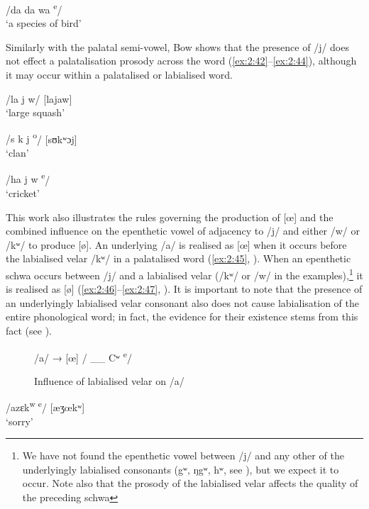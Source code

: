 \ea \label{ex:2:41}
\textup{/da da wa  \textsuperscript{e}}\textup{/  \ExampleSpace   [dɛdɛwɛ]}\\
\glt  ‘a species of bird’
\z

Similarly with the palatal semi-vowel, Bow shows that the presence of /j/ does not effect a palatalisation prosody across the word (\ref{ex:2:42}--\ref{ex:2:44}), although it may occur within a palatalised or labialised word.

\ea \label{ex:2:42}
\textup{/la j w/   \ExampleSpace \hspace{5pt} [lajaw]}\\
\glt  ‘large squash’
\z

\ea \label{ex:2:43}
\textup{/s k j \textsuperscript{o}}\textup{/    \ExampleSpace \hspace{5pt}   [sʊkʷɔj] }\\
\glt  ‘clan’    
\z

\ea \label{ex:2:44}
\textup{/ha j w\textsuperscript{ e}}\textup{/     \ExampleSpace [hɛjɛw]}\\
\glt  ‘cricket’  
\z

This work also illustrates the rules governing the production of [œ] and the combined influence on the epenthetic vowel of adjacency to /j/ and either /w/ or /kʷ/  to produce [ø]. An underlying /a/ is realised as [œ] when it occurs before the labialised velar /kʷ/ in a palatalised word (\ref{ex:2:45}, ). When an epenthetic schwa occurs between /j/ and a labialised velar (/kʷ/ or /w/ in the examples),\footnote{We have not found the epenthetic vowel between /j/ and any other of the underlyingly labialised consonants (gʷ, ŋgʷ, hʷ, see ), but we expect it to occur.  Note also that the prosody of the labialised velar affects the quality of the preceding schwa} it is realised as [ø] (\ref{ex:2:46}--\ref{ex:2:47}, ). It is important to note that the presence of an underlyingly labialised velar consonant also does not cause labialisation of the entire phonological word; in fact, the evidence for their existence stems from this fact (see ). 

\begin{figure}\caption{Influence of labialised velar on /a/\label{fig:2.6}}
\begin{centering}/a/ → [œ] /   \_\_ Cʷ \textsuperscript{e}/\end{centering}
\end{figure}

\ea \label{ex:2:45}
\textup{/azɛk\textsuperscript{w  e}}\textup{/ \ExampleSpace [æʒœkʷ}\textup{]}\\
\glt  ‘sorry’
\z

